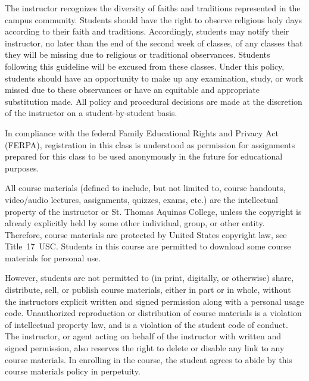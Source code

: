 \documentclass[11pt,letterpaper]{article}
\begin{document}
The instructor recognizes the diversity of faiths and traditions represented in the campus community. Students should have the right to observe religious holy days according to their faith and traditions. Accordingly, students may notify their instructor, no later than the end of the second week of classes, of any classes that they will be missing due to religious or traditional observances. Students following this guideline will be excused from these classes. Under this policy, students should have an opportunity to make up any examination, study, or work missed due to these observances or have an equitable and appropriate substitution made. All policy and procedural decisions are made at the discretion of the instructor on a student-by-student basis. 
\sectionbreak



In compliance with the federal Family Educational Rights and Privacy Act (FERPA), registration in this class is understood as permission for assignments prepared for this class to be used anonymously in the future for educational purposes.
\sectionbreak



All course materials (defined to include, but not limited to, course handouts, video/audio lectures, assignments, quizzes, exams, etc.) are the intellectual property of the instructor or St. Thomas Aquinas College, unless the copyright is already explicitly held by some other individual, group, or other entity. Therefore, course materials are protected by United States copyright law, see Title~17~USC. Students in this course are permitted to download some course materials for personal use. \pspace

However, students are not permitted to (in print, digitally, or otherwise) share, distribute, sell, or publish course materials, either in part or in whole, without the instructors explicit written and signed permission along with a personal usage code. Unauthorized reproduction or distribution of course materials is a violation of intellectual property law, and is a violation of the student code of conduct. The instructor, or agent acting on behalf of the instructor with written and signed permission, also reserves the right to delete or disable any link to any course materials. In enrolling in the course, the student agrees to abide by this course materials policy in perpetuity.
\sectionbreak
\end{document}
